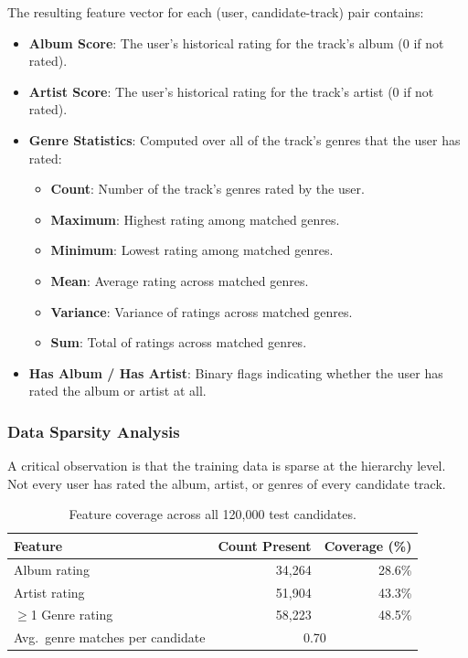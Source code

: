 \documentclass[12pt]{article}
\begin{document}
The resulting feature vector for each (user, candidate-track) pair contains:

\begin{itemize}
	\item \textbf{Album Score}: The user's historical rating for the track's album (0 if not rated).
	\item \textbf{Artist Score}: The user's historical rating for the track's artist (0 if not rated).
	\item \textbf{Genre Statistics}: Computed over all of the track's genres that the user has rated:
	\begin{itemize}
		\item \textbf{Count}: Number of the track's genres rated by the user.
		\item \textbf{Maximum}: Highest rating among matched genres.
		\item \textbf{Minimum}: Lowest rating among matched genres.
		\item \textbf{Mean}: Average rating across matched genres.
		\item \textbf{Variance}: Variance of ratings across matched genres.
		\item \textbf{Sum}: Total of ratings across matched genres.
	\end{itemize}
	\item \textbf{Has Album / Has Artist}: Binary flags indicating whether the user has rated the album or artist at all.
\end{itemize}

\subsubsection{Data Sparsity Analysis}

A critical observation is that the training data is sparse at the hierarchy level. Not every user has rated the album, artist, or genres of every candidate track.

\begin{table}[H]
	\centering
	\begin{tabular}{lrr}
		\toprule
		\textbf{Feature} & \textbf{Count Present} & \textbf{Coverage (\%)} \\
		\midrule
		Album rating     & 34,264  & 28.6\% \\
		Artist rating    & 51,904  & 43.3\% \\
		$\geq$1 Genre rating & 58,223 & 48.5\% \\
		\midrule
		Avg.\ genre matches per candidate & \multicolumn{2}{c}{0.70} \\
		\bottomrule
	\end{tabular}
	\caption{Feature coverage across all 120,000 test candidates.}\label{tab:sparsity}
\end{table}
\end{document}
